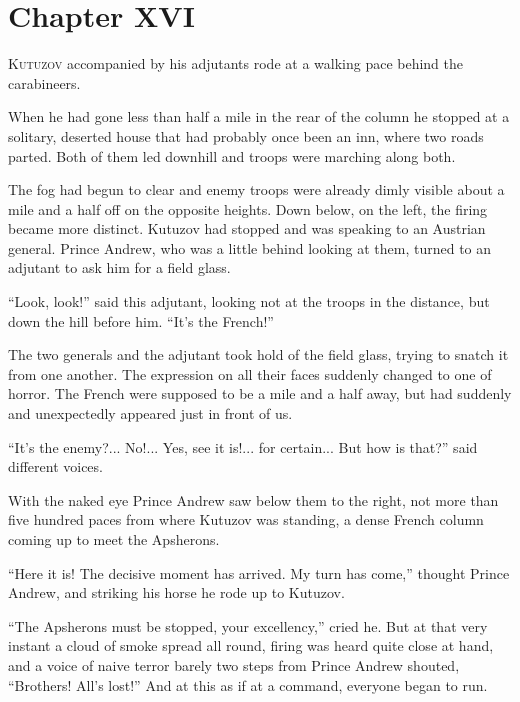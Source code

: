 \chapter*{Chapter XVI}
\ifaudio     
{} 
\fi

\lettrine[lines=2, loversize=0.3, lraise=0]{\initfamily K}{utuzov}
 accompanied by his adjutants rode at a walking pace
behind the carabineers.

When he had gone less than half a mile in the rear of the column
he stopped at a solitary, deserted house that had probably once
been an inn, where two roads parted. Both of them led downhill
and troops were marching along both.

The fog had begun to clear and enemy troops were already dimly
visible about a mile and a half off on the opposite heights. Down
below, on the left, the firing became more distinct. Kutuzov had
stopped and was speaking to an Austrian general. Prince Andrew,
who was a little behind looking at them, turned to an adjutant to
ask him for a field glass.

``Look, look!'' said this adjutant, looking not at the troops in
the distance, but down the hill before him. ``It's the French!''

The two generals and the adjutant took hold of the field glass,
trying to snatch it from one another. The expression on all their
faces suddenly changed to one of horror. The French were supposed
to be a mile and a half away, but had suddenly and unexpectedly
appeared just in front of us.

``It's the enemy?... No!... Yes, see it is!... for certain... But
how is that?'' said different voices.

With the naked eye Prince Andrew saw below them to the right, not
more than five hundred paces from where Kutuzov was standing, a
dense French column coming up to meet the Apsherons.

``Here it is! The decisive moment has arrived. My turn has
come,'' thought Prince Andrew, and striking his horse he rode up
to Kutuzov.

``The Apsherons must be stopped, your excellency,'' cried he. But
at that very instant a cloud of smoke spread all round, firing
was heard quite close at hand, and a voice of naive terror barely
two steps from Prince Andrew shouted, ``Brothers! All's lost!''
And at this as if at a command, everyone began to run.

